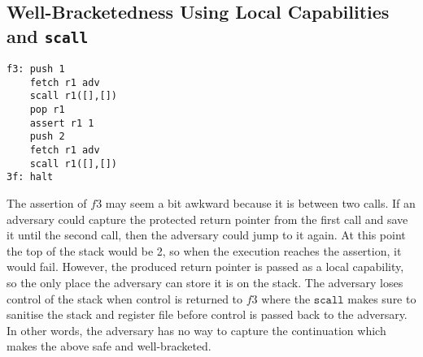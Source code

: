 \documentclass[a4paper]{article}
\begin{document}
\subsection{Well-Bracketedness Using Local Capabilities and \texttt{scall}}
\begin{comment}
\begin{verbatim}
let f = fun adv =>
          let x = 1 in
          adv();
          assert(!x == 1);
          x := 2;
          adv();
          return
\end{verbatim}
              A sensible calling scheme uses local capabilities for the continuation capability passed to the callee. In the above example, if \texttt{adv} can store the continuation, then 
              \texttt{adv} can invoke it during the second call and thus force the assertion to fail. We expect this program to either not terminate or terminate in a failed state (not caused by the assertion) or terminate with the result 0.
            \end{comment}

\begin{verbatim}
f3: push 1
    fetch r1 adv
    scall r1([],[])
    pop r1
    assert r1 1
    push 2
    fetch r1 adv
    scall r1([],[])
3f: halt
\end{verbatim}
The assertion of $f3$ may seem a bit awkward because it is between two calls. If an adversary could capture the protected return pointer from the first call and save it until the second call, then the adversary could jump to it again. At this point the top of the stack would be 2, so when the execution reaches the assertion, it would fail. However, the produced return pointer is passed as a local capability, so the only place the adversary can store it is on the stack. The adversary loses control of the stack when control is returned to $f3$ where the $\mathtt{scall}$ makes sure to sanitise the stack and register file before control is passed back to the adversary. In other words, the adversary has no way to capture the continuation which makes the above safe and well-bracketed.
\end{document}
